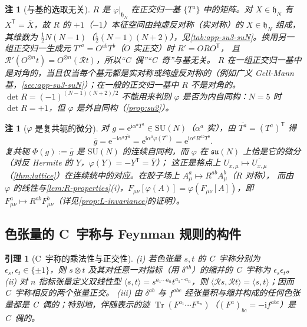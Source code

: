 \documentclass[UTF8,a4paper,11pt,fontset=fandol]{ctexart}
\theoremstyle{cplain}
\newtheorem{lemma}[theorem]{引理}
\theoremstyle{cdefinition}
\theoremstyle{cremark}
\newtheorem{remark}[theorem]{注}
\numberwithin{equation}{section}
\DeclareMathOperator{\Tr}{Tr}
\newcommand{\tp}{\mathsf{T}}                         %
\newcommand{\Rop}{\mathcal{R}}                       %
\newcommand{\su}{\mathfrak{su}}
\newcommand{\ii}{\mathrm{i}}                        %
\newcommand{\ee}{\mathrm{e}}                        %
\begin{document}
\begin{remark}[与基的选取无关]\label{rem:color-R-spectrum}
$R$ 是 $\varphi|_{\mathfrak h_N}$ 在正交归一基 $\{T^a\}$ 中的矩阵。对 $X\in\mathfrak h_N$ 有 $X^{\tp}=\overline X$，故 $R$ 的 $+1$（$-1$）本征空间由纯虚反对称（实对称）的 $X\in\mathfrak h_N$ 组成，
其维数为 $\frac12N(N-1)$（$\frac12(N-1)(N+2)$），见\cref{tab:app-su3-suN}。换用另一组正交归一生成元 $T'^a=O^{ab}T^b$（$O$ 实正交）时 $R'=ORO^{\tp}$，
且 $\Rop'(O^{\otimes n}t)=O^{\otimes n}(\Rop t)$，所以“C~偶”“C~奇”与基无关。
$R$ 在一组正交归一基中是对角的，当且仅当每个基元都是实对称或纯虚反对称的（例如广义 Gell-Mann 基，\cref{sec:app-su3-suN}）；在一般的正交归一基中 $R$ 不是对角的。
$\det R=(-1)^{(N-1)(N+2)/2}$ 不能用来判别 $\varphi$ 是否为内自同构：$N=5$ 时 $\det R=+1$，但 $\varphi$ 是外自同构（\cref{prop:su2}）。
\end{remark}

\begin{remark}[$\varphi$ 是复共轭的微分]\label{rem:color-group}
对 $g=\ee^{\ii\alpha^aT^a}\in\mathrm{SU}(N)$（$\alpha^a$ 实），由 $\overline{T^a}=(T^a)^{\tp}$ 得
\begin{equation}\label{eq:color-conj-group}
\overline g=\ee^{-\ii\alpha^a\overline{T^a}}=\ee^{\ii\alpha^a\varphi(T^a)}=\ee^{\ii\alpha^aR^{ab}T^b}.
\end{equation}
复共轭 $\Phi(g):=\overline g$ 是 $\mathrm{SU}(N)$ 的连续自同构，而 $\varphi$ 在 $\su(N)$ 上恰是它的微分（对反 Hermite 的 $Y$，$\varphi(Y)=-Y^{\tp}=\overline Y$）；
这正是格点上 $U_{x,\mu}\mapsto\overline{U_{x,\mu}}$（\cref{thm:lattice}）在连续统中的对应。在胶子场上 $A^a_\mu\mapsto R^{ab}A^b_\mu$（$R$ 对称），
而由 $\varphi$ 的线性与\cref{lem:R-properties}(i)，$F_{\mu\nu}[\varphi(A)]=\varphi(F_{\mu\nu}[A])$，即 $F^a_{\mu\nu}\mapsto R^{ab}F^b_{\mu\nu}$（详见\cref{prop:L-invariance}的证明）。
\end{remark}

\subsection{色张量的 C~宇称与 Feynman 规则的构件}\label{sec:color-parity}

\begin{lemma}[C~宇称的乘法性与正交性]\label{lem:contraction}
(i) 若色张量 $s,t$ 的 C~宇称分别为 $\epsilon_s,\epsilon_t\in\{\pm1\}$，则 $s\otimes t$ 及其对任意一对指标（用 $\delta^{ab}$）的缩并的 C~宇称为 $\epsilon_s\epsilon_t$。
(ii) 对 $n$ 指标张量定义双线性型 $\langle s,t\rangle=s^{a_1\cdots a_n}t^{a_1\cdots a_n}$，则 $\langle\Rop s,\Rop t\rangle=\langle s,t\rangle$；因而 C~宇称相反的两个张量正交。
(iii) 由 $\delta^{ab}$ 与 $f^{abc}$ 经张量积与缩并构成的任何色张量都是 C~偶的；特别地，伴随表示的迹 $\Tr(F^{a_1}\cdots F^{a_n})$（$(F^a)_{bc}=-\ii f^{abc}$）是 C~偶的。
\end{lemma}
\end{document}

